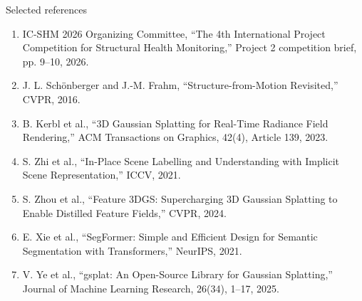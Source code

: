 \documentclass[aspectratio=169,10pt]{beamer}
\begin{document}
\begin{frame}{Selected references}
\scriptsize\begin{enumerate}\tightitems
\item IC-SHM 2026 Organizing Committee, ``The 4th International Project Competition for Structural Health Monitoring,'' Project 2 competition brief, pp. 9--10, 2026.
\item J. L. Sch\"onberger and J.-M. Frahm, ``Structure-from-Motion Revisited,'' CVPR, 2016.
\item B. Kerbl et al., ``3D Gaussian Splatting for Real-Time Radiance Field Rendering,'' ACM Transactions on Graphics, 42(4), Article 139, 2023.
\item S. Zhi et al., ``In-Place Scene Labelling and Understanding with Implicit Scene Representation,'' ICCV, 2021.
\item S. Zhou et al., ``Feature 3DGS: Supercharging 3D Gaussian Splatting to Enable Distilled Feature Fields,'' CVPR, 2024.
\item E. Xie et al., ``SegFormer: Simple and Efficient Design for Semantic Segmentation with Transformers,'' NeurIPS, 2021.
\item V. Ye et al., ``gsplat: An Open-Source Library for Gaussian Splatting,'' Journal of Machine Learning Research, 26(34), 1--17, 2025.
\end{enumerate}
\end{frame}
\end{document}
